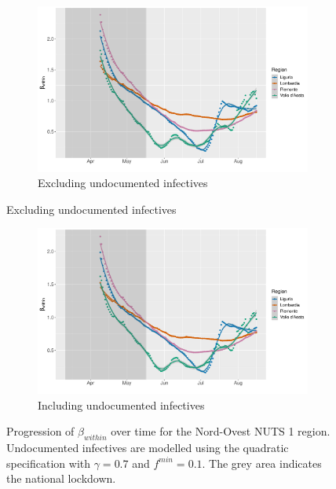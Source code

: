 \documentclass[12pt]{article}
\begin{document}
\begin{appendices}
		\begin{figure}[H]
    	    \centering
    	    \begin{subfigure}{\textwidth}
    	      \centering
    	      \includegraphics[width=0.94\linewidth]{output/model_within_lag14_betawithin_Nord-Ovest_rollingwindow30.pdf}
    	      \caption{Excluding undocumented infectives}
    	      \label{fig:beta_within_over_time_northwest_lowsample_regular}
    	    \end{subfigure}
        \end{figure}
        \begin{figure}[H]\ContinuedFloat
    	    \begin{subfigure}{\textwidth}
    	      \centering
    	      \includegraphics[width=0.94\linewidth]{output/model_within_lag14_betawithin_Nord-Ovest_UndocQuadratic_rollingwindow30.pdf}
    	      \caption{Including undocumented infectives}
    	      \label{fig:beta_within_over_time_northwest_lowsample_regular_undoc}
    	    \end{subfigure}
    	    \caption{Progression of $\beta_{within}$ over time for the Nord-Ovest NUTS 1 region. Undocumented infectives are modelled using the quadratic specification with $\gamma = 0.7$ and $f^{min}=0.1$. The grey area indicates the national lockdown.}
    	    \label{fig:beta_within_over_time_northwest_lowsample}
    	\end{figure}
		

\end{appendices}
\end{document}
